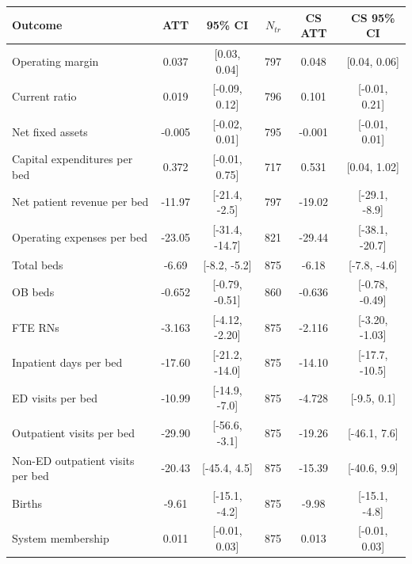 \begin{tabular}{lccrcc}
\toprule
Outcome & ATT & 95\% CI & $N_{tr}$ & CS ATT & CS 95\% CI \\
\midrule
Operating margin & 0.037 & [0.03, 0.04] & 797 & 0.048 & [0.04, 0.06] \\
Current ratio & 0.019 & [-0.09, 0.12] & 796 & 0.101 & [-0.01, 0.21] \\
Net fixed assets & -0.005 & [-0.02, 0.01] & 795 & -0.001 & [-0.01, 0.01] \\
Capital expenditures per bed & 0.372 & [-0.01, 0.75] & 717 & 0.531 & [0.04, 1.02] \\
Net patient revenue per bed & -11.97 & [-21.4, -2.5] & 797 & -19.02 & [-29.1, -8.9] \\
Operating expenses per bed & -23.05 & [-31.4, -14.7] & 821 & -29.44 & [-38.1, -20.7] \\
\addlinespace
Total beds & -6.69 & [-8.2, -5.2] & 875 & -6.18 & [-7.8, -4.6] \\
OB beds & -0.652 & [-0.79, -0.51] & 860 & -0.636 & [-0.78, -0.49] \\
FTE RNs & -3.163 & [-4.12, -2.20] & 875 & -2.116 & [-3.20, -1.03] \\
Inpatient days per bed & -17.60 & [-21.2, -14.0] & 875 & -14.10 & [-17.7, -10.5] \\
\addlinespace
ED visits per bed & -10.99 & [-14.9, -7.0] & 875 & -4.728 & [-9.5, 0.1] \\
Outpatient visits per bed & -29.90 & [-56.6, -3.1] & 875 & -19.26 & [-46.1, 7.6] \\
Non-ED outpatient visits per bed & -20.43 & [-45.4, 4.5] & 875 & -15.39 & [-40.6, 9.9] \\
Births & -9.61 & [-15.1, -4.2] & 875 & -9.98 & [-15.1, -4.8] \\
\addlinespace
System membership & 0.011 & [-0.01, 0.03] & 875 & 0.013 & [-0.01, 0.03] \\
\bottomrule
\end{tabular}
